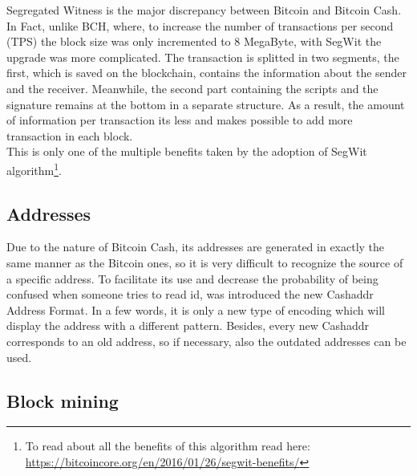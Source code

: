 Segregated Witness is the major discrepancy between Bitcoin and Bitcoin Cash. In Fact,
unlike BCH, where, to increase the number of transactions per second (TPS)
the block size was only incremented to 8 MegaByte, with SegWit the upgrade was more 
complicated. The transaction is splitted in two segments, the first, which is saved 
on the blockchain, contains the information about the sender and the receiver. 
Meanwhile, the second part containing the scripts and the signature remains at the 
bottom in a separate structure. As a result, the amount of information per transaction
its less and makes possible to add more transaction in each block.\\
This is only one of the multiple benefits taken by the adoption of SegWit 
algorithm\footnote{To read about all the benefits of this algorithm read here:
 \url{https://bitcoincore.org/en/2016/01/26/segwit-benefits/}}.

\subsection{Addresses}
\label{sec:addresses}

Due to the nature of Bitcoin Cash, its addresses are generated in exactly the same 
manner as the Bitcoin ones, so it is very difficult to recognize the source of 
a specific address. To facilitate its use and decrease the probability of being 
confused when someone tries to read id, was introduced the new Cashaddr Address 
Format. In a few words, it is only a new type of encoding which will display the 
address with a different pattern. Besides, every new Cashaddr corresponds to 
an old address, so if necessary, also the outdated addresses can be used.

\subsection{Block mining}
\label{sec:mining}

